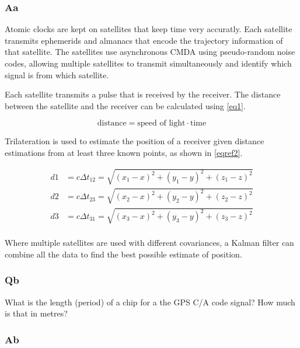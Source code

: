 \documentclass[11pt]{article}
\begin{document}
\subsubsection{Aa}

Atomic clocks are kept on satellites that keep time very accuratly. Each satellite transmits ephemerids and almanacs that encode the trajectory information of that satellite. The satellites use asynchronous CMDA using pseudo-random noise codes, allowing multiple satellites to transmit simultaneously and identify which signal is from which satellite. 

Each satellite transmits a pulse that is received by the receiver. The distance between the satellite and the receiver can be calculated using  \eqref{eq1}.

\begin{equation}\label{eq1}
    \text{distance} = \text{speed of light} \cdot \text{time}
\end{equation}


Trilateration is used to estimate the position of a receiver given distance estimations from at least three known points, as shown in \eqref{eqref2}.

\begin{equation}
    \begin{split}
        d1 &= c \Delta t_{12} = \sqrt{\left(x_1 - x\right)^2 + \left(y_1 - y\right)^2 + \left(z_1 - z\right)^2}\\
        d2 &= c \Delta t_{23} = \sqrt{\left(x_2 - x\right)^2 + \left(y_2 - y\right)^2 + \left(z_2 - z\right)^2}\\
        d3 &= c \Delta t_{31} = \sqrt{\left(x_3 - x\right)^2 + \left(y_3 - y\right)^2 + \left(z_3 - z\right)^2}\\
    \end{split}\label{eqref2}
\end{equation}

Where multiple satellites are used with different covariances, a Kalman filter can combine all the data to find the best possible estimate of position. 


\subsubsection{Qb}
What is the length (period) of a chip for a the GPS C/A code signal? How much is that in metres?
\subsubsection{Ab}
\end{document}
